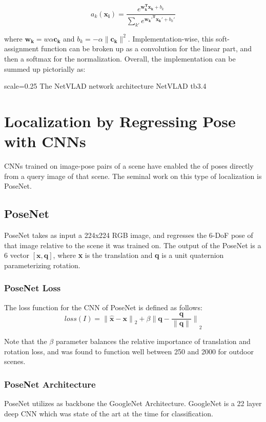 \[a_k(\mathbf{x_i}) = \frac{e^{\mathbf{w_k^T x_k} + b_k}}{\sum_{k'}e^{\mathbf{w_k'^T x_k'} + b_k'}}\]

where $\mathbf{w_k} = w\alpha\mathbf{c_k}$ and $b_k = -\alpha\|\mathbf{c_k}\|^2$. Implementation-wise, this soft-assignment function can be broken up as a convolution
for the linear part, and then a softmax for the normalization. Overall, the implementation can be summed up pictorially as:

{scale=0.25}%
{The NetVLAD network architecture}%
{NetVLAD}%
{tb3.4} %

\section{Localization by Regressing Pose with CNNs}
CNNs trained on image-pose pairs of a scene have enabled the  of poses directly from a query image of that scene. The seminal work on this type of localization is PoseNet.

\subsection{PoseNet}
PoseNet takes as input a 224x224 RGB image, and regresses the 6-DoF pose of that image relative to the scene it was trained on. The output of the PoseNet is a 6 vector $[\mathbf{x}, \mathbf{q}]$, where \textbf{x} is the translation and \textbf{q} is a unit quaternion parameterizing rotation. 

\subsubsection{PoseNet Loss}
The loss function for the CNN of PoseNet is defined as follows:
\[loss(I) = \mathbf{\|\hat{x} - x\|}_2 + \beta\mathbf{\|q - \dfrac{q}{\|q\|}\|}_2\]

Note that the $\beta$ parameter balances the relative importance of translation and rotation loss, and was found to function well between 250 and 2000 for outdoor scenes.

\subsubsection{PoseNet Architecture}
PoseNet utilizes as backbone the GoogleNet Architecture. GoogleNet is a 22 layer deep CNN which was state of the art at the time for classification.

